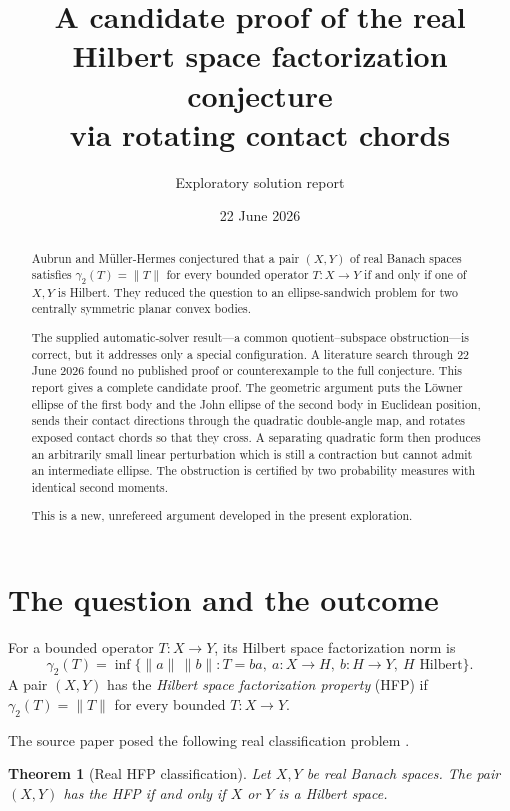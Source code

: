 \documentclass[11pt]{amsart}
\title[A candidate proof of the real HFP conjecture]{A candidate proof of the real Hilbert space factorization conjecture\\via rotating contact chords}
\author{Exploratory solution report}
\date{22 June 2026}
\newtheorem{theorem}{Theorem}[section]
\theoremstyle{definition}
\theoremstyle{remark}
\newcommand{\ga}{\gamma_2}
\begin{document}
\begin{abstract}
Aubrun and M\"uller-Hermes conjectured that a pair $(X,Y)$ of real Banach
spaces satisfies $\gamma_2(T)=\|T\|$ for every bounded operator $T:X\to Y$
if and only if one of $X,Y$ is Hilbert.  They reduced the question to an
ellipse-sandwich problem for two centrally symmetric planar convex bodies.

The supplied automatic-solver result---a common quotient--subspace
obstruction---is correct, but it addresses only a special configuration.  A
literature search through 22 June 2026 found no published proof or
counterexample to the full conjecture.  This report gives a complete candidate proof.
The geometric argument puts the L\"owner ellipse of the first body and the
John ellipse of the second body in Euclidean position, sends their contact
directions through the quadratic double-angle map, and rotates exposed
contact chords so that they cross.  A separating quadratic form then produces
an arbitrarily small linear perturbation which is still a contraction but
cannot admit an intermediate ellipse.  The obstruction is certified by two
probability measures with identical second moments.

This is a new, unrefereed argument developed in the present exploration.
\end{abstract}

\maketitle

\section{The question and the outcome}

For a bounded operator $T:X\to Y$, its Hilbert space factorization norm is
\[
 \ga(T)=\inf\{\|a\|\,\|b\|:T=ba,\ a:X\to H,\ b:H\to Y,\ H\text{ Hilbert}\}.
\]
A pair $(X,Y)$ has the \emph{Hilbert space factorization property} (HFP) if
$\ga(T)=\|T\|$ for every bounded $T:X\to Y$.

The source paper posed the following real classification problem
\cite[Conjecture 5.2]{AMH-limit}.

\begin{theorem}[Real HFP classification]\label{thm:HFP}
Let $X,Y$ be real Banach spaces.  The pair $(X,Y)$ has the HFP if and only if
$X$ or $Y$ is a Hilbert space.
\end{theorem}
\end{document}
